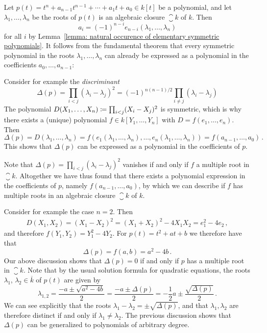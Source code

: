 \begin{example}
  \label{example: multiple roots via symmetric polynomials}
  Let $p(t) = t^n + a_{n-1} t^{n-1} + \dotsb + a_1 t + a_0 \in k[t]$ be a polynomial, and let $\lambda_1, \dotsc, \lambda_n$ be the roots of $p(t)$ is an algebraic closure $\closure{k}$ of $k$.
  Then
  \[
      a_i
    = (-1)^{n-i} e_{n-i}(\lambda_1, \dotsc, \lambda_n)
  \]
  for all $i$ by Lemma~\ref{lemma: natural occurence of elementary symmetric polynomials}.
  It follows from the fundamental theorem that every symmetric polynomial in the roots $\lambda_1, \dotsc, \lambda_n$ can already be expressed as a polynomial in the coefficients $a_0, \dotsc, a_{n-1}$:
  
  Consider for example the \emph{discriminant}
  \[
      \Delta(p)
    = \prod_{i < j} (\lambda_i - \lambda_j)^2
    = (-1)^{n(n-1)/2} \prod_{i \neq j} (\lambda_i - \lambda_j)
  \]
  The polynomial $D(X_1, \dotsc, X_n) \coloneqq \prod_{i < j} (X_i - X_j)^2$ is symmetric, which is why there exists a (unique) polynomial $f \in k[Y_1, \dotsc, Y_n]$ with $D = f(e_1, \dotsc, e_n)$.
  Then
  \[
      \Delta(p)
    = D(\lambda_1, \dotsc, \lambda_n)
    = f(e_1(\lambda_1, \dotsc, \lambda_n), \dotsc, e_n(\lambda_1, \dotsc, \lambda_n))
    = f(a_{n-1}, \dotsc, a_0) \,.
  \]
  This shows that $\Delta(p)$ can be expressed as a polynomial in the coefficients of $p$.
  
  Note that $\Delta(p) = \prod_{i < j} (\lambda_i - \lambda_j)^2$ vanishes if and only if $f$ a multiple root in $\closure{k}$.
  Altogether we have thus found that there exists a polynomial expression in the coefficients of $p$, namely $f(a_{n-1}, \dotsc, a_0)$, by which we can describe if $f$ has multiple roots in an algebraic closure $\closure{k}$ of $k$.
  
  Consider for example the case $n = 2$.
  Then
  \begin{align*}
        D(X_1, X_2)
     =  (X_1 - X_2)^2
     =  (X_1 + X_2)^2 - 4 X_1 X_2
     =  e_1^2 - 4 e_2 \,,
  \end{align*}
  and therefore $f(Y_1, Y_2) = Y_1^2 - 4 Y_2$.
  For $p(t) = t^2 + a t + b$ we therefore have that
  \[
      \Delta(p)
    = f(a,b)
    = a^2 - 4 b \,.
  \]
  Our above discussion shows that $\Delta(p) = 0$ if and only if $p$ has a multiple root in $\closure{k}$.
  Note that by the usual solution formula for quadratic equations, the roots $\lambda_1$, $\lambda_2 \in \overline{k}$ of $p(t)$ are given by
  \[  
      \lambda_{1,2}
    = \frac{-a \pm \sqrt{a^2 - 4b}}{2}
    = \frac{-a \pm \Delta(p)}{2}
    = -\frac{1}{2} a \pm \frac{\sqrt{\Delta(p)}}{2} \,.
  \]
  We can see explicitly that the roots $\lambda_1 - \lambda_2 = \pm \sqrt{\Delta(p)}$, and that $\lambda_1, \lambda_2$ are therefore distinct if and only if $\lambda_1 \neq \lambda_2$.
  The previous discussion shows that $\Delta(p)$ can be generalized to polynomials of arbitrary degree.
\end{example}


